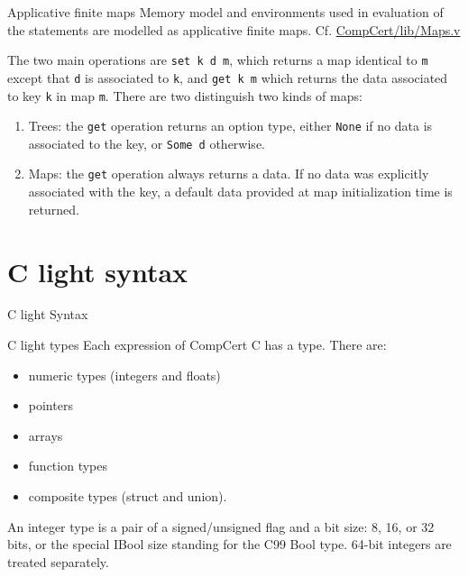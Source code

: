 \documentclass{beamer}
\begin{document}
\begin{frame}{Applicative finite maps}
  Memory model and environments used in evaluation of the statements are modelled as applicative finite maps. Cf. \url{CompCert/lib/Maps.v}

  \bigskip
  The two main operations are \texttt{set k d m}, which returns a map identical to \texttt{m} except that \texttt{d}
  is associated to \texttt{k}, and \texttt{get k m} which returns the data associated
  to key \texttt{k} in map \texttt{m}.  There are two distinguish two kinds of maps:
  \begin{enumerate}
\item Trees: the \texttt{get} operation returns an option type, either \texttt{None}
  if no data is associated to the key, or \texttt{Some d} otherwise.
\item Maps: the \texttt{get} operation always returns a data.  If no data was explicitly
  associated with the key, a default data provided at map initialization time
  is returned.
  \end{enumerate}
  \end{frame}


\section{C light syntax}
\begin{frame}
  \begin{center}
    \huge C light Syntax
    \end{center}
  \end{frame}


\begin{frame}{C light types}
  Each expression of CompCert C has a type. There are:
  \begin{itemize}
   \item numeric types (integers and floats)
   \item pointers
   \item arrays
   \item function types
     \item composite types (struct and union).
 \end{itemize}
  An integer type is a pair of a signed/unsigned
  flag and a bit size: 8, 16, or 32 bits, or the special IBool size
  standing for the C99 Bool type.  64-bit integers are treated separately.
  

\end{frame}
\end{document}
